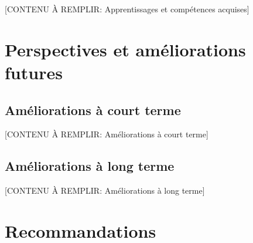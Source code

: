 [CONTENU À REMPLIR: Apprentissages et compétences acquises]


\section*{Perspectives et améliorations futures}


\subsection*{Améliorations à court terme}

[CONTENU À REMPLIR: Améliorations à court terme]


\subsection*{Améliorations à long terme}

[CONTENU À REMPLIR: Améliorations à long terme]


\section*{Recommandations}


